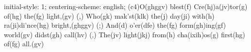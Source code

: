 initial-style: 1;
centering-scheme: english;
(c4)O(ghggv) blest(f) Cre(hj)a(jv)tor(g) of(hg) the(fg) light,(gv) (,)
Who(gk) mak'st(klk) the(j) day(ji) with(h) ra(ji)di'nce(hg) bright,(ghggv) (;)
And(d) o'er(dfe) the(fg) form(gh)ing(gf) world(gv) didst(gh) call(hv) (,)
The(jv) light(jkj) from(h) cha(ixih)os(g) first(hg) of(fg) all.(gv)